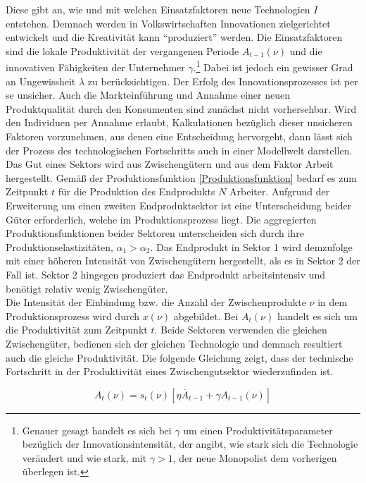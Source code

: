 Diese gibt an, wie und mit welchen Einsatzfaktoren neue Technologien $I$ entstehen. Demnach werden in Volkswirtschaften Innovationen zielgerichtet entwickelt und die Kreativität kann "`produziert"' werden. Die Einsatzfaktoren sind die lokale Produktivität der vergangenen Periode $A_{t-1}(\nu)$ und die innovativen Fähigkeiten der Unternehmer $\gamma$.\footnote{Genauer gesagt handelt es sich bei $\gamma$ um einen Produktivitätsparameter bezüglich der Innovationsintensität, der angibt, wie stark sich die Technologie verändert und wie stark, mit $\gamma>1$, der neue Monopolist dem vorherigen überlegen ist.} Dabei ist jedoch ein gewisser Grad an Ungewissheit $\lambda$ zu berücksichtigen. Der Erfolg des Innovationsprozesses ist per se unsicher. Auch die Markteinführung und Annahme einer neuen Produktqualität durch den Konsumenten sind zunächst nicht vorhersehbar. Wird den Individuen per Annahme erlaubt, Kalkulationen bezüglich dieser unsicheren Faktoren vorzunehmen, aus denen eine Entscheidung hervorgeht, dann lässt sich der Prozess des technologischen Fortschritts auch in einer Modellwelt darstellen.\\
Das Gut eines Sektors wird aus Zwischengütern und aus dem Faktor Arbeit hergestellt. Gemä{\ss} der Produktionsfunktion \eqref{Produktionsfunktion} bedarf es zum Zeitpunkt $t$ für die Produktion des Endprodukts $N$ Arbeiter. Aufgrund der Erweiterung um einen zweiten Endproduktsektor ist eine Unterscheidung beider Güter erforderlich, welche im Produktionsprozess liegt. Die aggregierten Produktionsfunktionen beider Sektoren unterscheiden sich durch ihre Produktionselastizitäten, $\alpha_1>\alpha_2$. Das Endprodukt in Sektor 1 wird demzufolge mit einer höheren Intensität von Zwischengütern hergestellt, als es in Sektor 2 der Fall ist. Sektor 2 hingegen produziert das Endprodukt arbeitsintensiv und benötigt relativ wenig Zwischengüter. \\


Die Intensität der Einbindung bzw. die Anzahl der Zwischenprodukte $\nu$ in dem Produktionsprozess wird durch $x(\nu)$ abgebildet. Bei $ A_t(\nu)$ handelt es sich um die Produktivität zum Zeitpunkt $t$. Beide Sektoren verwenden die gleichen Zwischengüter, bedienen sich der gleichen Technologie und demnach resultiert auch die gleiche Produktivität. Die folgende Gleichung zeigt, dass der technische Fortschritt in der Produktivität eines Zwischengutsektor wiederzufinden ist. 

	\begin{equation}
		A_t(\nu)=s_t(\nu)[\eta\overline{A}_{t-1}+\gamma A_{t-1}(\nu)]\label{Produktivitat}
	\end{equation}

